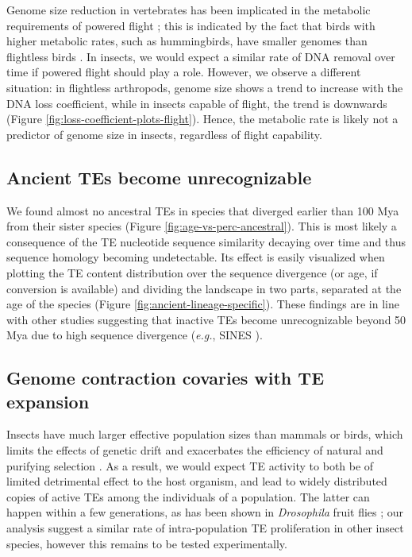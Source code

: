 Genome size reduction in vertebrates has been implicated in the
metabolic requirements of powered flight \citep{Wright2014}; this is
indicated by the fact that birds with higher metabolic rates, such as
hummingbirds, have smaller genomes than flightless birds
\citep{Gregory2005}. In insects, we would expect a similar rate of DNA
removal over time if powered flight should play a role. However, we
observe a different situation: in flightless arthropods, genome size
shows a trend to increase with the DNA loss coefficient, while in
insects capable of flight, the trend is downwards (Figure
\ref{fig:loss-coefficient-plots-flight}). Hence, the
metabolic rate is likely not a predictor of genome size in insects,
regardless of flight capability.

\subsection*{Ancient TEs become
unrecognizable}

We found almost no ancestral TEs in species that diverged earlier than
100 Mya from their sister species (Figure
\ref{fig:age-vs-perc-ancestral}). This is most likely a
consequence of the TE nucleotide sequence similarity decaying over time
and thus sequence homology becoming undetectable. Its effect is easily
visualized when plotting the TE content distribution over the sequence
divergence (or age, if conversion is available) and dividing the
landscape in two parts, separated at the age of the species (Figure
\ref{fig:ancient-lineage-specific}).
These findings are in line with other studies suggesting that inactive
TEs become unrecognizable beyond 50 Mya due to high sequence divergence
(\emph{e.g.}, SINES \citep{Shedlock2000}).

\subsection*{Genome contraction covaries with TE
expansion}

Insects have much larger effective population sizes than mammals or
birds, which limits the effects of genetic drift and exacerbates the
efficiency of natural and purifying selection \citep{Szitenberg2016}. As a
result, we would expect TE activity to both be of limited detrimental
effect to the host organism, and lead to widely distributed copies of
active TEs among the individuals of a population. The latter can happen
within a few generations, as has been shown in \emph{Drosophila} fruit
flies \citep{Kofler2015}; our analysis suggest a similar rate of
intra-population TE proliferation in other insect species, however this
remains to be tested experimentally.

